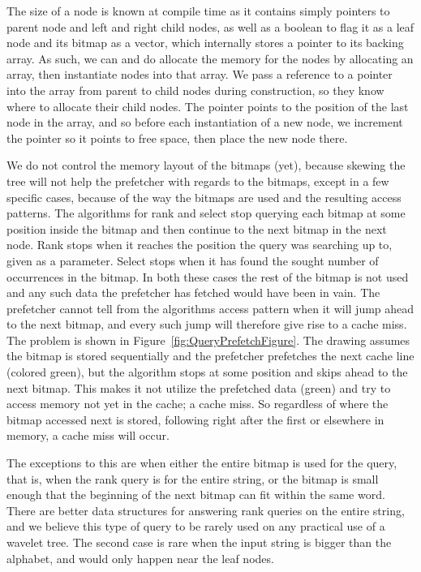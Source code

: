 The size of a node is known at compile time as it contains simply pointers to parent node and left and right child nodes, as well as a boolean to flag it as a leaf node and its bitmap as a vector, which internally stores a pointer to its backing array.
As such, we can and do allocate the memory for the nodes by allocating an array, then instantiate nodes into that array.
We pass a reference to a pointer into the array from parent to child nodes during construction, so they know where to allocate their child nodes.
The pointer points to the position of the last node in the array, and so before each instantiation of a new node, we increment the pointer so it points to free space, then place the new node there.

We do not control the memory layout of the bitmaps (yet), because skewing the tree will not help the prefetcher with regards to the bitmaps, except in a few specific cases, because of the way the bitmaps are used and the resulting access patterns.
The algorithms for rank and select stop querying each bitmap at some position inside the bitmap and then continue to the next bitmap in the next node.
Rank stops when it reaches the position the query was searching up to, given as a parameter.
Select stops when it has found the sought number of occurrences in the bitmap.
In both these cases the rest of the bitmap is not used and any such data the prefetcher has fetched would have been in vain.
The prefetcher cannot tell from the algorithms access pattern when it will jump ahead to the next bitmap, and every such jump will therefore give rise to a cache miss.
The problem is shown in Figure~\ref{fig:QueryPrefetchFigure}. The drawing assumes the bitmap is stored sequentially and the prefetcher prefetches the next cache line (colored green), but the algorithm stops at some position and skips ahead to the next bitmap. This makes it not utilize the prefetched data (green) and try to access memory not yet in the cache; a cache miss.
So regardless of where the bitmap accessed next is stored, following right after the first or elsewhere in memory, a cache miss will occur.

The exceptions to this are when either the entire bitmap is used for the query, that is, when the rank query is for the entire string, or the bitmap is small enough that the beginning of the next bitmap can fit within the same word.
There are better data structures for answering rank queries on the entire string, and we believe this type of query to be rarely used on any practical use of a wavelet tree.
The second case is rare when the input string is bigger than the alphabet, and would only happen near the leaf nodes.

